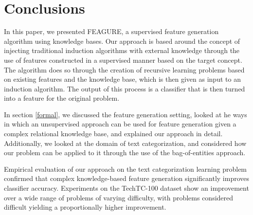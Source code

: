 \documentclass[twoside,11pt]{article}
\theoremstyle{definition}
\begin{document}



\section{Conclusions}

In this paper, we presented FEAGURE, a supervised feature generation algorithm using knowledge bases. Our approach is based around the concept of injecting traditional induction algorithms with external knowledge through the use of features constructed in a supervised manner based on the target concept. 
The algorithm does so through the creation of recursive learning problems based on existing features and the knowledge base, which is then given as input to an induction algorithm. The output of this process is a classifier that is then turned into a feature for the original problem.

In section \ref{formal}, we discussed the feature generation setting, looked at he ways in which an unsupervised approach can be used for feature generation given a complex relational knowledge base, and explained our approach in detail.
Additionally, we looked at the domain of text categorization, and considered how our problem can be applied to it through the use of the bag-of-entities approach.

Empirical evaluation of our approach on the text categorization learning problem confirmed that complex knowledge-based feature generation significantly improves classifier accuracy. Experiments on the TechTC-100 dataset show an improvement over a wide range of problems of varying difficulty, with problems considered difficult yielding a proportionally higher improvement.
\end{document}
